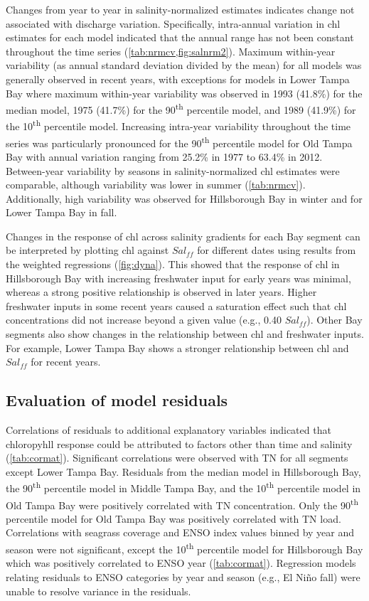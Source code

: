 \documentclass{svjour3}\usepackage[]{graphicx}\usepackage[]{color}
\newcommand{\nine}{90\textsuperscript{th} percentile }
\newcommand{\ten}{10\textsuperscript{th} percentile }
\begin{document}
Changes from year to year in salinity-normalized estimates indicates change not associated with discharge variation.  Specifically, intra-annual variation in \ac{chl} estimates for each model indicated that the annual range has not been constant throughout the time series (\cref{tab:nrmcv,fig:salnrm2}).  Maximum within-year variability (as annual standard deviation divided by the mean) for all models was generally observed in recent years, with exceptions for models in Lower Tampa Bay where maximum within-year variability was observed in 1993 (41.8\%) for the median model, 1975 (41.7\%) for the \nine model, and 1989 (41.9\%) for the \ten model.  Increasing intra-year variability throughout the time series was particularly pronounced for the \nine model for Old Tampa Bay with annual variation ranging from 25.2\% in 1977  to 63.4\% in 2012.  Between-year variability by seasons in salinity-normalized \ac{chl} estimates were comparable, although variability was lower in summer (\cref{tab:nrmcv}).  Additionally, high variability was observed for Hillsborough Bay in winter and for Lower Tampa Bay in fall.

Changes in the response of \ac{chl} across salinity gradients for each Bay segment can be interpreted by plotting \ac{chl} against $Sal_{ff}$ for different dates using results from the weighted regressions (\cref{fig:dyna}).  This showed that the response of \ac{chl} in Hillsborough Bay with increasing freshwater input for early years was minimal, whereas a strong positive relationship is observed in later years.  Higher freshwater inputs in some recent years caused a saturation effect such that \ac{chl} concentrations did not increase beyond a given value (e.g., 0.40 $Sal_{ff}$).  Other Bay segments also show changes in the relationship between \ac{chl} and freshwater inputs.  For example, Lower Tampa Bay shows a stronger relationship between \ac{chl} and $Sal_{ff}$ for recent years. 

\subsection{Evaluation of model residuals}

Correlations of residuals to additional explanatory variables indicated that chloropyhll response could be attributed to factors other than time and salinity (\cref{tab:cormat}). Significant correlations were observed with \ac{TN} for all segments except Lower Tampa Bay.  Residuals from the median model in Hillsborough Bay, the \nine model in Middle Tampa Bay, and the \ten model in Old Tampa Bay were positively correlated with \ac{TN} concentration.  Only the \nine model for Old Tampa Bay was positively correlated with \ac{TN} load.  Correlations with seagrass coverage and \ac{ENSO} index values binned by year and season were not significant, except the \ten model for Hillsborough Bay which was positively correlated to \ac{ENSO} year (\cref{tab:cormat}).  Regression models relating residuals to \ac{ENSO} categories by year and season (e.g., El Ni\~{n}o fall) were unable to resolve variance in the residuals.  
\end{document}
